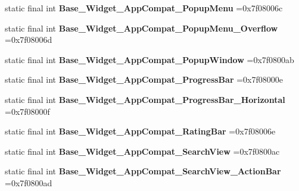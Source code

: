 \begin{DoxyCompactItemize}
\item 
\hypertarget{classcheck_1_1test_1_1_r_1_1style_a1b24c9fbe26033b3e6b45156888c6998}{}static final int {\bfseries Base\+\_\+\+Widget\+\_\+\+App\+Compat\+\_\+\+Popup\+Menu} =0x7f08006c\label{classcheck_1_1test_1_1_r_1_1style_a1b24c9fbe26033b3e6b45156888c6998}

\item 
\hypertarget{classcheck_1_1test_1_1_r_1_1style_a2db6860efc3d38f2a759c49854383dd1}{}static final int {\bfseries Base\+\_\+\+Widget\+\_\+\+App\+Compat\+\_\+\+Popup\+Menu\+\_\+\+Overflow} =0x7f08006d\label{classcheck_1_1test_1_1_r_1_1style_a2db6860efc3d38f2a759c49854383dd1}

\item 
\hypertarget{classcheck_1_1test_1_1_r_1_1style_afa5895f37233d3d6c9298fdee78e40e8}{}static final int {\bfseries Base\+\_\+\+Widget\+\_\+\+App\+Compat\+\_\+\+Popup\+Window} =0x7f0800ab\label{classcheck_1_1test_1_1_r_1_1style_afa5895f37233d3d6c9298fdee78e40e8}

\item 
\hypertarget{classcheck_1_1test_1_1_r_1_1style_a80a04d2c20956962e7f50e1350cd23f2}{}static final int {\bfseries Base\+\_\+\+Widget\+\_\+\+App\+Compat\+\_\+\+Progress\+Bar} =0x7f08000e\label{classcheck_1_1test_1_1_r_1_1style_a80a04d2c20956962e7f50e1350cd23f2}

\item 
\hypertarget{classcheck_1_1test_1_1_r_1_1style_a2ef6b15fc55bae77dda98d927f0d50ba}{}static final int {\bfseries Base\+\_\+\+Widget\+\_\+\+App\+Compat\+\_\+\+Progress\+Bar\+\_\+\+Horizontal} =0x7f08000f\label{classcheck_1_1test_1_1_r_1_1style_a2ef6b15fc55bae77dda98d927f0d50ba}

\item 
\hypertarget{classcheck_1_1test_1_1_r_1_1style_a8c97619d735b4cabe7e6feadedf381e6}{}static final int {\bfseries Base\+\_\+\+Widget\+\_\+\+App\+Compat\+\_\+\+Rating\+Bar} =0x7f08006e\label{classcheck_1_1test_1_1_r_1_1style_a8c97619d735b4cabe7e6feadedf381e6}

\item 
\hypertarget{classcheck_1_1test_1_1_r_1_1style_a8a1daec01515c3d8875240995569140c}{}static final int {\bfseries Base\+\_\+\+Widget\+\_\+\+App\+Compat\+\_\+\+Search\+View} =0x7f0800ac\label{classcheck_1_1test_1_1_r_1_1style_a8a1daec01515c3d8875240995569140c}

\item 
\hypertarget{classcheck_1_1test_1_1_r_1_1style_a48feae0de40de7a29678c64466c59e72}{}static final int {\bfseries Base\+\_\+\+Widget\+\_\+\+App\+Compat\+\_\+\+Search\+View\+\_\+\+Action\+Bar} =0x7f0800ad\label{classcheck_1_1test_1_1_r_1_1style_a48feae0de40de7a29678c64466c59e72}


\end{DoxyCompactItemize}
